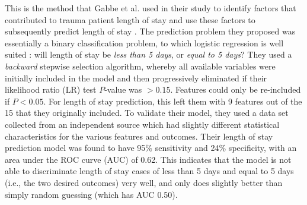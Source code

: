 This is the method that Gabbe et al. used in their study to identify factors
that contributed to trauma patient length of stay and use these factors to
subsequently predict length of stay \citep{Gabbe2005}. The prediction problem
they proposed was essentially a binary classification problem, to which
logistic regression is well suited \citep{Tu1996}: will length of stay be
\textit{less than 5 days}, or \textit{equal to 5 days}? They used a
\textit{backward} stepwise selection algorithm, whereby all available variables
were initially included in the model and then progressively eliminated if their
likelihood ratio (LR) test $P$-value was $>0.15$. Features could only be
re-included if $P<0.05$. For length of stay
prediction, this left them with 9 features out of the 15 that they originally
included. To validate their model, they used a data set collected from an
independent source which had slightly different statistical characteristics for
the various features and outcomes. Their length of stay prediction model was
found to have 95\% sensitivity and 24\% specificity, with an area under the ROC
curve (AUC) of 0.62. This indicates that the model is not able to discriminate
length of stay cases of less than 5 days and equal to 5 days (i.e., the two
desired outcomes) very well, and only does
slightly better than simply random guessing (which has AUC 0.50).


